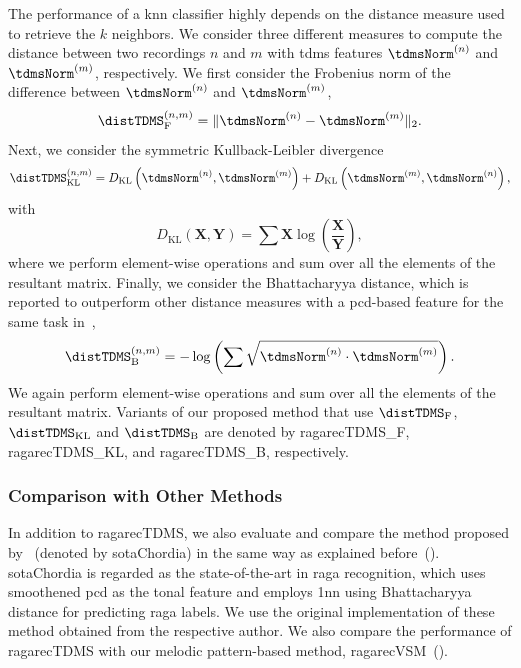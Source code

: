 The performance of a \gls{knn} classifier highly depends on the distance measure used to retrieve the $k$ neighbors. We consider three different measures to compute the distance between two recordings $n$ and $m$ with \gls{tdms} features $\tdmsNorm^{(n)}$ and $\tdmsNorm^{(m)}$, respectively. We first consider the Frobenius norm of the difference between $\tdmsNorm^{(n)}$ and $\tdmsNorm^{(m)}$,
\begin{equation}
\distTDMS_{\mathrm{F}}^{(n,m)} = \norm{\tdmsNorm^{(n)} - \tdmsNorm^{(m)}}_2 .
\end{equation}
Next, we consider the symmetric Kullback-Leibler divergence
\begin{equation}
\distTDMS_{\mathrm{KL}}^{(n,m)} = D_{\mathrm{KL}}\left(\tdmsNorm^{(n)},\tdmsNorm^{(m)}\right) + D_{\mathrm{KL}}\left(\tdmsNorm^{(m)},\tdmsNorm^{(n)}\right) ,
\end{equation}
with
\begin{equation}
D_{\mathrm{KL}}\left(\mathbf{X},\mathbf{Y}\right) = \sum{\mathbf{X} \log\left(\frac{\mathbf{X}}{\mathbf{Y}} \right)} ,
\end{equation}
where we perform element-wise operations and sum over all the elements of the resultant matrix. Finally, we consider the Bhattacharyya distance, which is reported to outperform other distance measures with a \gls{pcd}-based feature for the same task in~\cite{chordia2013joint},
\begin{equation}
\distTDMS_{\mathrm{B}}^{(n,m)} = -\log\left( \sum{ \sqrt{ \tdmsNorm^{(n)} \cdot \tdmsNorm^{(m)} } } \right) .
\end{equation}
We again perform element-wise operations and sum over all the elements of the resultant matrix. Variants of our proposed method that use $\distTDMS_{\mathrm{F}}$, $\distTDMS_{\mathrm{KL}}$ and $\distTDMS_{\mathrm{B}}$ are denoted by \acrshort{ragarecTDMS_F}, \acrshort{ragarecTDMS_KL}, and \acrshort{ragarecTDMS_B}, respectively.


\subsubsection{Comparison with Other Methods}
\label{sec:tdms_comparison_other}

In addition to \acrshort{ragarecTDMS}, we also evaluate and compare the method proposed by~\cite{chordia2013joint} (denoted by \acrshort{sotaChordia}) in the same way as explained before~(). \acrshort{sotaChordia} is regarded as the state-of-the-art in \gls{raga} recognition, which uses smoothened \acrfull{pcd} as the tonal feature and employs \acrfull{1nn} using Bhattacharyya distance for predicting \gls{raga} labels. We use the original implementation of these method obtained from the respective author. We also compare the performance of \acrshort{ragarecTDMS} with our melodic pattern-based method, \acrshort{ragarecVSM}~().

